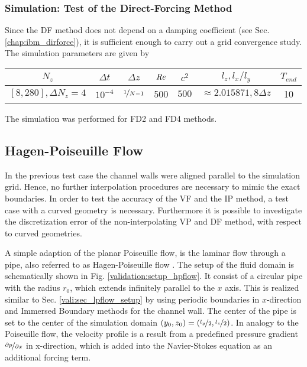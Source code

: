\subsubsection{Simulation: Test of the Direct-Forcing Method}

Since the DF method does not depend on a damping coefficient (see Sec. \ref{chap:ibm_dirforce}),
it is sufficient enough to carry out a grid convergence study.  The simulation parameters are given by

\begin{center}
\vspace*{0.3ex}
\begin{tabular}{c|c|c|c|c|c|c }
 $ N_z  $                       &  $\Delta t$ & $\Delta z$            & $\mbox{\textit{Re}}$  & $c^2$   & $l_z, l_x/l_y$ & $T_{end}$\\
\hline
 $[8, 280], \Delta N_z = 4 $ &  $10^{-4}$ & $\nicefrac{1}{N - 1}$ & 500     & $500$   & $\approx{2.015871}, 8\Delta z$  & 10\\
\end{tabular}
\vspace*{0.3ex}
\end{center}
The simulation was performed for FD2 and FD4 methods.

\subsection{Hagen-Poiseuille Flow}

\label{vali:section_hpflow_start}

In the previous test case the channel walls were aligned parallel to the simulation grid. Hence, no further interpolation procedures
are necessary to mimic the exact boundaries.
In order to test the accuracy of the VF and the IP method, a test case with a curved geometry is necessary.
Furthermore it is possible to investigate the discretization error of the non-interpolating VP and DF method, with respect to curved geometries.

A simple adaption of the planar Poiseuille flow, is the laminar flow through a pipe, also referred to as Hagen-Poiseuille flow \citep{tritton88}.
The setup of the fluid domain is schematically shown in Fig. \ref{validation:setup_hpflow}.
It consist of a circular pipe with the radius $r_0$, which extends infinitely parallel to the $x$ axis.
This is realized similar to Sec. \ref{vali:sec_lpflow_setup} by using periodic boundaries in $x$-direction
and Immersed Boundary methods for the channel wall.
The center of the pipe is set to the center of the simulation domain ${(y_0, z_0) = (\nicefrac{l_y}{2}, \nicefrac{l_z}{2})}$.
In analogy to the Poiseuille flow, the velocity profile is a result from a predefined pressure gradient $\nicefrac{\partial p}{\partial x}$ in x-direction,
which  is added into the Navier-Stokes equation as an additional forcing term.

